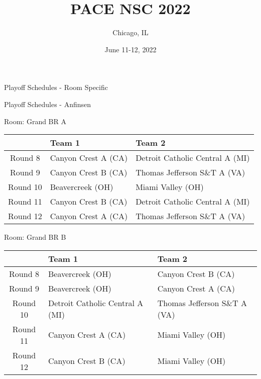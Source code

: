 \documentclass{article}%
\title{PACE NSC 2022}%
\author{Chicago, IL}%
\date{June 11{-}12, 2022}%
\begin{document}
%
\normalsize%
%
\maketitle%
\vspace*{48pt}%
\begin{center}%
\begin{Huge}%
Playoff Schedules {-} Room Specific%
\end{Huge}%
\end{center}%
\newpage%
\begin{center}%
\begin{Huge}%
Playoff Schedules {-} Anfinsen%
\end{Huge}%
\end{center}%
\begin{flushleft}%
\begin{Large}%
Room: Grand BR A%
\end{Large}%
\end{flushleft}%
\begin{tabularx}{\textwidth}{|c|Y|Y|}%
\hline%
&Team 1&Team 2\\%
\hline%
Round 8&Canyon Crest A (CA)&Detroit Catholic Central A (MI)\\%
Round 9&Canyon Crest B (CA)&Thomas Jefferson S\&T A (VA)\\%
Round 10&Beavercreek (OH)&Miami Valley (OH)\\%
Round 11&Canyon Crest B (CA)&Detroit Catholic Central A (MI)\\%
Round 12&Canyon Crest A (CA)&Thomas Jefferson S\&T A (VA)\\%
\hline%
\end{tabularx}%
\vspace*{8pt}%
\linebreak%
\begin{flushleft}%
\begin{Large}%
Room: Grand BR B%
\end{Large}%
\end{flushleft}%
\begin{tabularx}{\textwidth}{|c|Y|Y|}%
\hline%
&Team 1&Team 2\\%
\hline%
Round 8&Beavercreek (OH)&Canyon Crest B (CA)\\%
Round 9&Beavercreek (OH)&Canyon Crest A (CA)\\%
Round 10&Detroit Catholic Central A (MI)&Thomas Jefferson S\&T A (VA)\\%
Round 11&Canyon Crest A (CA)&Miami Valley (OH)\\%
Round 12&Canyon Crest B (CA)&Miami Valley (OH)\\%
\hline%
\end{tabularx}%
\end{document}
